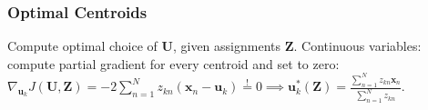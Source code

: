 \documentclass[11pt,a4paper,technote]{IEEEtran}
\DeclareMathOperator*{\argmin}{\arg\!\min}
\newcommand{\norm}[1]{\left\lVert#1\right\rVert}
\newcommand{\matr}[1]{\boldsymbol{\mathbf{#1}}}
\newcommand{\vect}[1]{\boldsymbol{\mathbf{#1}}}
\begin{document}
\subsubsection*{Optimal Centroids}
Compute optimal choice of $\matr{U}$, given assignments $\matr{Z}$. Continuous
variables: compute partial gradient for every centroid and set to zero:
\(
  \nabla_{\vect{u}_k} J(\matr{U},\matr{Z}) = -2 \sum_{n=1}^N z_{kn}
  (\vect{x}_n - \vect{u}_k) \stackrel{!}{=} 0 \implies
  \vect{u}_k^*(\matr{Z}) = \frac{\sum_{n=1}^N z_{kn} \vect{x}_n}
  {\sum_{n=1}^N z_{kn}}
\).

\end{document}
